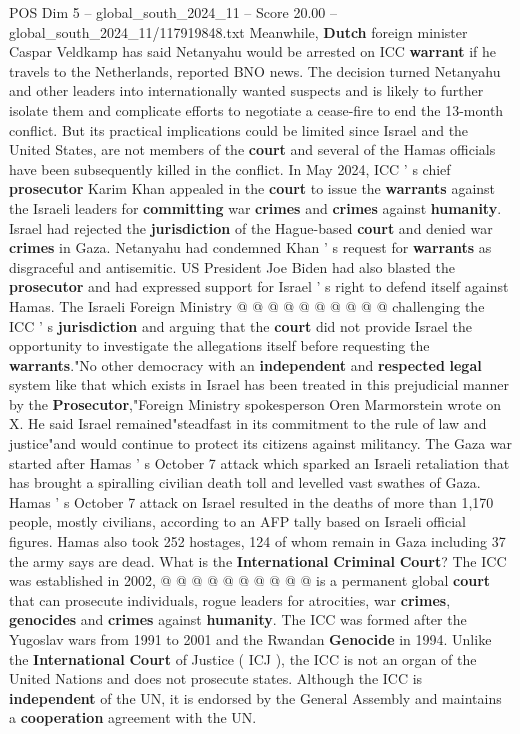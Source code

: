 \begin{textsample}{POS Dim 5 – global\_south\_2024\_11 – Score 20.00 – global\_south\_2024\_11/117919848.txt}
Meanwhile, \textbf{Dutch} foreign minister Caspar Veldkamp has said Netanyahu would be arrested on ICC \textbf{warrant} if he travels to the Netherlands, reported BNO news.
The decision turned Netanyahu and other leaders into internationally wanted suspects and is likely to further isolate them and complicate efforts to negotiate a cease-fire to end the 13-month conflict.
But its practical implications could be limited since Israel and the United States, are not members of the \textbf{court} and several of the Hamas officials have been subsequently killed in the conflict.
In May 2024, ICC ' s chief \textbf{prosecutor} Karim Khan appealed in the \textbf{court} to issue the \textbf{warrants} against the Israeli leaders for \textbf{committing} war \textbf{crimes} and \textbf{crimes} against \textbf{humanity}.
Israel had rejected the \textbf{jurisdiction} of the Hague-based \textbf{court} and denied war \textbf{crimes} in Gaza.
Netanyahu had condemned Khan ' s request for \textbf{warrants} as disgraceful and antisemitic.
US President Joe Biden had also blasted the \textbf{prosecutor} and had expressed support for Israel ' s right to defend itself against Hamas.
The Israeli Foreign Ministry @ @ @ @ @ @ @ @ @ @ challenging the ICC ' s \textbf{jurisdiction} and arguing that the \textbf{court} did not provide Israel the opportunity to investigate the allegations itself before requesting the \textbf{warrants}."No other democracy with an \textbf{independent} and \textbf{respected} \textbf{legal} system like that which exists in Israel has been treated in this prejudicial manner by the \textbf{Prosecutor},"Foreign Ministry spokesperson Oren Marmorstein wrote on X.
He said Israel remained"steadfast in its commitment to the rule of law and justice"and would continue to protect its citizens against militancy.
The Gaza war started after Hamas ' s October 7 attack which sparked an Israeli retaliation that has brought a spiralling civilian death toll and levelled vast swathes of Gaza.
Hamas ' s October 7 attack on Israel resulted in the deaths of more than 1,170 people, mostly civilians, according to an AFP tally based on Israeli official figures.
Hamas also took 252 hostages, 124 of whom remain in Gaza including 37 the army says are dead.
What is the \textbf{International} \textbf{Criminal} \textbf{Court}?
The ICC was established in 2002, @ @ @ @ @ @ @ @ @ @ is a permanent global \textbf{court} that can prosecute individuals, rogue leaders for atrocities, war \textbf{crimes}, \textbf{genocides} and \textbf{crimes} against \textbf{humanity}.
The ICC was formed after the Yugoslav wars from 1991 to 2001 and the Rwandan \textbf{Genocide} in 1994.
Unlike the \textbf{International} \textbf{Court} of Justice ( ICJ ), the ICC is not an organ of the United Nations and does not prosecute states.
Although the ICC is \textbf{independent} of the UN, it is endorsed by the General Assembly and maintains a \textbf{cooperation} agreement with the UN.

\end{textsample}
